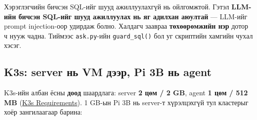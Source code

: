 Хэрэглэгчийн бичсэн SQL-ийг шууд ажиллуулахгүй нь ойлгомжтой. Гэтэл \textbf{LLM-ийн бичсэн SQL-ийг шууд ажиллуулах нь яг адилхан аюултай} --- LLM-ийг prompt injection-оор удирдаж болно. Халдагч заавраа \textbf{төхөөрөмжийн нэр} дотор ч нууж чадна. Тиймээс \texttt{ask.py}-ийн \texttt{guard\_sql()} бол уг скриптийн хамгийн чухал хэсэг.

\hypertarget{k3s-server-ux43dux44c-vm-ux434ux44dux44dux440-pi-3b-ux43dux44c-agent}{%
\subsection{K3s: server нь VM дээр, Pi 3B нь agent}\label{k3s-server-ux43dux44c-vm-ux434ux44dux44dux440-pi-3b-ux43dux44c-agent}}

K3s-ийн албан ёсны \textbf{доод} шаардлага: server \textbf{2 цөм / 2 GB}, agent \textbf{1 цөм / 512 MB} (\href{https://docs.k3s.io/installation/requirements}{K3s Requirements}). 1 GB-ын Pi 3B нь server-т хүрэлцэхгүй тул кластерыг хоёр зангилаагаар барина:

